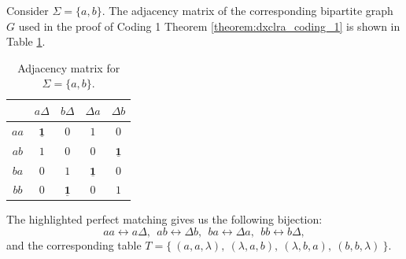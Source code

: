 \begin{example}\label{example:dxclra_ab}
Consider $\Sigma = \{a, b\}$. The adjacency matrix of the corresponding bipartite graph $G$ used in the proof of Coding 1 Theorem \ref{theorem:dxclra_coding_1} is shown in Table \ref{table:dxclra_example:dxclra_ab}.
\begin{table}[ht]
\centering
\begin{tabular}{| c || c | c | c | c |}
 \hline
     &  $a \Delta$  &   $b \Delta$&  $\Delta a$  &  $\Delta b$  \\
\hline\hline
$aa$ & $\mathbf{\underline{1}}$ &      $0$     &      $1$     &    $0$\\
\hline
$ab$ &      $1$     &      $0$     &      $0$     & $\mathbf{\underline{1}}$\\
\hline
$ba$ &      $0$     &      $1$     & $\mathbf{\underline{1}}$ &    $0$\\
\hline
$bb$ &      $0$     & $\mathbf{\underline{1}}$ &      $0$     &    $1$\\
\hline
\end{tabular}
\caption{Adjacency matrix for $\Sigma = \{a, b\}$.}
\label{table:dxclra_example:dxclra_ab}
\end{table}
The highlighted perfect matching gives us the following bijection:
$$aa \leftrightarrow a \Delta,
\ \ ab \leftrightarrow \Delta b,
\ \ ba \leftrightarrow \Delta a,
\ \ bb \leftrightarrow b \Delta,$$
and the corresponding table $T = \{
\ (a, a, \lambda),
\ (\lambda, a, b),
\ (\lambda, b, a),
\ (b, b, \lambda)\ \}$.
\end{example}

